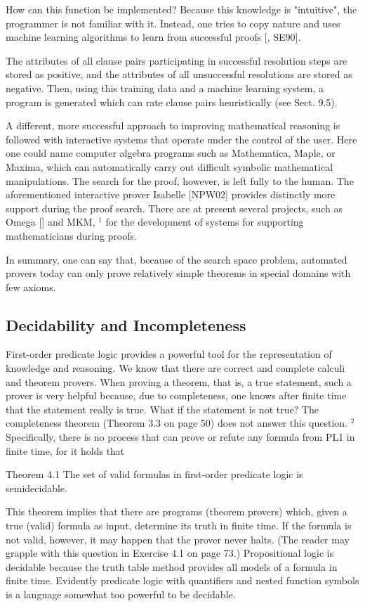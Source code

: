\documentclass[10pt]{book}
\begin{document}
How can this function be implemented? Because this knowledge is "intuitive", the programmer is not familiar with it. Instead, one tries to copy nature and uses machine learning algorithms to learn from successful proofs [\cite{ess89}, SE90].

The attributes of all clause pairs participating in successful resolution steps are stored as positive, and the attributes of all unsuccessful resolutions are stored as negative. Then, using this training data and a machine learning system, a program is generated which can rate clause pairs heuristically (see Sect. 9.5).

A different, more successful approach to improving mathematical reasoning is followed with interactive systems that operate under the control of the user. Here one could name computer algebra programs such as Mathematica, Maple, or Maxima, which can automatically carry out difficult symbolic mathematical manipulations. The search for the proof, however, is left fully to the human. The aforementioned interactive prover Isabelle [NPW02] provides distinctly more support during the proof search. There are at present several projects, such as Omega [\cite{sb04}] and MKM, ${ }^{1}$ for the development of systems for supporting mathematicians during proofs.

In summary, one can say that, because of the search space problem, automated provers today can only prove relatively simple theorems in special domains with few axioms.

\subsection{Decidability and Incompleteness}
First-order predicate logic provides a powerful tool for the representation of knowledge and reasoning. We know that there are correct and complete calculi and theorem provers. When proving a theorem, that is, a true statement, such a prover is very helpful because, due to completeness, one knows after finite time that the statement really is true. What if the statement is not true? The completeness theorem (Theorem 3.3 on page 50) does not answer this question. ${ }^{2}$ Specifically, there is no process that can prove or refute any formula from PL1 in finite time, for it holds that

Theorem 4.1 The set of valid formulas in first-order predicate logic is semidecidable.

This theorem implies that there are programs (theorem provers) which, given a true (valid) formula as input, determine its truth in finite time. If the formula is not valid, however, it may happen that the prover never halts. (The reader may grapple with this question in Exercise 4.1 on page 73.) Propositional logic is decidable because the truth table method provides all models of a formula in finite time. Evidently predicate logic with quantifiers and nested function symbols is a language somewhat too powerful to be decidable.
\end{document}
